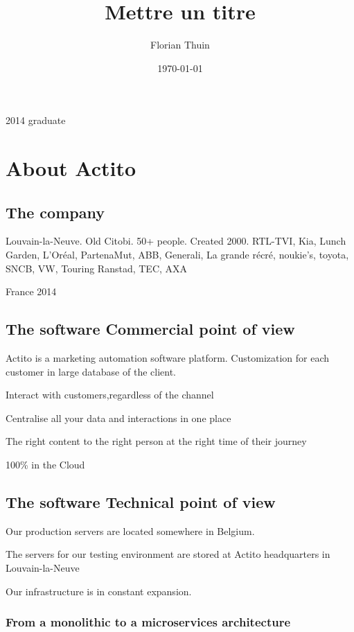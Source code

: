 \documentclass[a4paper, 11pt]{article}
\author{Florian Thuin}
\date{\today}
\title{Mettre un titre}
\begin{document}
    \maketitle
    \tableofcontents

    2014 graduate

    \section{About Actito}

    \subsection{The company}

    Louvain-la-Neuve. Old Citobi. 50+ people. Created 2000. RTL-TVI, Kia, Lunch Garden,
    L'Oréal, PartenaMut, ABB, Generali, La grande récré, noukie's, toyota, SNCB, VW, Touring
    Ranstad, TEC, AXA

    France 2014

    \subsection{The software \textemdash{} Commercial point of view}

    Actito is a marketing automation software platform. Customization for each
    customer in large database of the client.

    Interact with customers,regardless of the channel

    Centralise all your data and interactions in one place

    The right content to the right person at the right time of their journey

    100\% in the Cloud

    \subsection{The software \textemdash{} Technical point of view}

    Our production servers are located somewhere in Belgium.

    The servers for our testing environment are stored at Actito headquarters in
    Louvain-la-Neuve

    Our infrastructure is in constant expansion.

    \subsubsection{From a monolithic to a microservices architecture}
\end{document}
